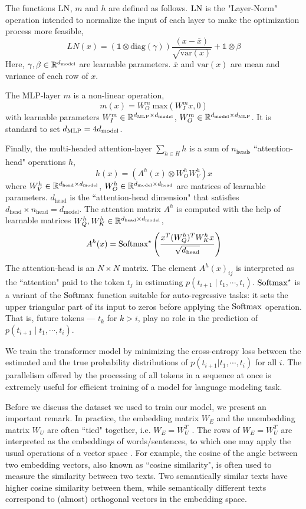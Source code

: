 The functions $\text{LN}$, $m$ and $h$ are defined as follows. $\text{LN}$ is the "Layer-Norm" operation intended to normalize the input of each layer to make the optimization process more feasible,
\[
LN(x) = \left(\mathbb{1} \otimes \text{diag}(\gamma) \right) \frac{(x-\overline{x})}{\sqrt{\text{var}(x)}} + \mathbb{1} \otimes \beta
\]
Here, $\gamma, \beta \in \mathbb{R}^{d_{\text{model}}}$ are learnable parameters. $\overline{x}$ and $\text{var}(x)$ are mean and variance of each row of $x$.

The MLP-layer $m$ is a non-linear operation, 
\[
m(x) =W^m_O \ \text{max}(W_I^m x, 0)
\]
with learnable parameters $W^m_I \in \mathbb{R}^{d_{\text{MLP}} \times d_{\text{model}}}$, $W^m_O \in \mathbb{R}^{d_{\text{model}} \times d_{\text{MLP}}}$. It is standard to set $d_{\text{MLP}} = 4 d_{\text{model}}$.

Finally, the multi-headed attention-layer $\sum_{h \in H} h$ is a sum of $n_{\text{heads}}$ ``attention-head" operations $h$, 
\[
h(x) = (A^h(x) \otimes W^h_O W^h_V) x
\]
where $W^h_V \in \mathbb{R}^{d_{\text{head}} \times d_{\text{model}}}$, 
$W^h_O \in \mathbb{R}^{d_{\text{model}} \times d_{\text{head}}}$ 
are matrices of learnable parameters. 
$d_{\text{head}}$ is the ``attention-head dimension" that satisfies $d_{\text{head}} \times n_{\text{head}} = d_{\text{model}}$. 
The attention matrix $A^h$ is computed with the help of learnable matrices 
$W^h_Q, W^h_K \in \mathbb{R}^{d_{\text{head}} \times d_{\text{model}}}$,
\[
A^h(x) = \text{Softmax}^\star \left(\frac{x^T (W^h_Q)^T W^h_K x}{\sqrt{d_{\text{head}}}}\right)
\] 
The attention-head is an $N \times N$ matrix. The element $A^h(x)_{ij}$ 
is interpreted as the ``attention" paid to the token 
$t_j$ in estimating 
$p(t_{i+1} \mid t_1, \cdots, t_i)$. $\text{Softmax}^\star$
is a variant of the $\text{Softmax}$ function suitable for auto-regressive tasks: it sets the upper triangular part of its input to zeros before applying the 
$\text{Softmax}$ operation. 
That is, future tokens --- $t_k$ for $k > i$, play no role in the prediction of $p(t_{i+1} \mid t_1, \cdots, t_i)$.

We train the transformer model by minimizing the cross-entropy loss between the estimated and the true probability distributions of $p(t_{i+1} | t_1, \cdots, t_{i})$ for all $i$. The parallelism offered by the processing of all tokens in a sequence at once is extremely useful for efficient training of a model for language modeling task.

Before we discuss the dataset we used to train our model, we present an important remark. In practice, the embedding matrix $W_E$ and the unembedding matrix $W_U$ are often ``tied" together, i.e. $W_E = W_U^T$ \cite{press2017using, inan2017tying}.
The rows of $W_E = W_U^T$ are interpreted as the embeddings of words/sentences, to which one may apply the usual operations of a vector space \cite{Bengio:2003, mikolov-etal-2013-linguistic}. 
For example, the cosine of the angle between two embedding vectors, also known as ``cosine similarity", is often used to measure the similarity between two texts. 
Two semantically similar texts have higher cosine similarity between them, while semantically different texts correspond to (almost) orthogonal vectors in the embedding space.



